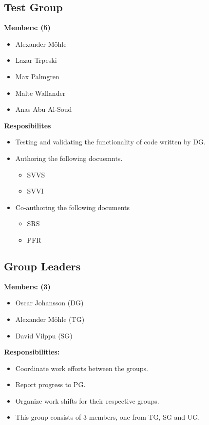 \documentclass{article}
\begin{document}
    \subsection{Test Group}
        \textbf{Members: (5)}
        \begin{itemize}
            \item Alexander Möhle
            \item Lazar Trpeski
            \item Max Palmgren
            \item Malte Wallander
            \item Anas Abu Al-Soud
        \end{itemize}
        \textbf{Resposibilites}
        \begin{itemize}
            \item Testing and validating the functionality of code written by DG.
            \item Authoring the following docuemnts.
            \begin{itemize}
                \item SVVS
                \item SVVI
            \end{itemize}
            \item Co-authoring the following documents
                \begin{itemize}
                    \item SRS
                    \item PFR
                \end{itemize}
        \end{itemize}
    
    \subsection{Group Leaders}
        \textbf{Members: (3)}
        \begin{itemize}
            \item Oscar Johansson (DG)
            \item Alexander Möhle (TG)
            \item David Vilppu (SG)
        \end{itemize}
        \textbf{Responsibilities: }
        \begin{itemize}
            \item Coordinate work efforts between the groups. 
            \item Report progress to PG.
            \item Organize work shifts for their respective groups. 
            \item This group consists of 3 members, one from TG, SG and UG. 
        \end{itemize}
        
\end{document}
